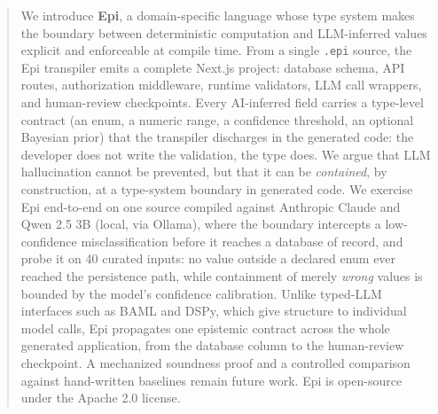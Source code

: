 \documentclass[sigconf]{acmart}
\begin{document}
\begin{abstract}
We introduce \textbf{Epi}, a domain-specific language whose type system makes the boundary between deterministic computation and LLM-inferred values explicit and enforceable at compile time. From a single \texttt{.epi} source, the Epi transpiler emits a complete Next.js project: database schema, API routes, authorization middleware, runtime validators, LLM call wrappers, and human-review checkpoints. Every AI-inferred field carries a type-level contract (an enum, a numeric range, a confidence threshold, an optional Bayesian prior) that the transpiler discharges in the generated code: the developer does not write the validation, the type does. We argue that LLM hallucination cannot be prevented, but that it can be \emph{contained}, by construction, at a type-system boundary in generated code. We exercise Epi end-to-end on one source compiled against Anthropic Claude and Qwen 2.5 3B (local, via Ollama), where the boundary intercepts a low-confidence misclassification before it reaches a database of record, and probe it on 40 curated inputs: no value outside a declared enum ever reached the persistence path, while containment of merely \emph{wrong} values is bounded by the model's confidence calibration. Unlike typed-LLM interfaces such as BAML and DSPy, which give structure to individual model calls, Epi propagates one epistemic contract across the whole generated application, from the database column to the human-review checkpoint. A mechanized soundness proof and a controlled comparison against hand-written baselines remain future work. Epi is open-source under the Apache 2.0 license.
\end{abstract}


\frenchspacing
\maketitle

\thispagestyle{firstpagestyle}
\end{document}
